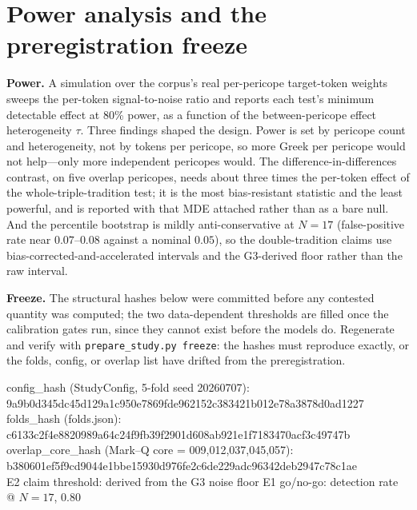 \documentclass[11pt,letterpaper]{article}
\begin{document}
\section{Power analysis and the preregistration freeze}
\label{app:prereg}

\textbf{Power.} A simulation over the corpus's real per-pericope target-token weights sweeps the per-token signal-to-noise ratio and reports each test's minimum detectable effect at 80\% power, as a function of the between-pericope effect heterogeneity $\tau$. Three findings shaped the design. Power is set by pericope count and heterogeneity, not by tokens per pericope, so more Greek per pericope would not help---only more independent pericopes would. The difference-in-differences contrast, on five overlap pericopes, needs about three times the per-token effect of the whole-triple-tradition test; it is the most bias-resistant statistic and the least powerful, and is reported with that MDE attached rather than as a bare null. And the percentile bootstrap is mildly anti-conservative at $N=17$ (false-positive rate near $0.07$--$0.08$ against a nominal $0.05$), so the double-tradition claims use bias-corrected-and-accelerated intervals and the G3-derived floor rather than the raw interval.

\textbf{Freeze.} The structural hashes below were committed before any contested quantity was computed; the two data-dependent thresholds are filled once the calibration gates run, since they cannot exist before the models do. Regenerate and verify with \texttt{prepare\_study.py freeze}: the hashes must reproduce exactly, or the folds, config, or overlap list have drifted from the preregistration.

\begin{tcolorbox}[enhanced, breakable, colback=papyrus, colframe=papyrus,
  boxrule=0pt, arc=0pt, outer arc=0pt,
  borderline west={2.0pt}{0pt}{stone}, left=13pt, right=13pt, top=8pt, bottom=8pt]
{\footnotesize\ttfamily
config\_hash (StudyConfig, 5-fold seed 20260707):\\
\hspace*{1em}9a9b0d345dc45d129a1c950e7869fde962152c383421b012e78a3878d0ad1227\\[2pt]
folds\_hash (folds.json):\\
\hspace*{1em}c6133c2f4e8820989a64c24f9fb39f2901d608ab921e1f7183470acf3c49747b\\[2pt]
overlap\_core\_hash (Mark--Q core = 009,012,037,045,057):\\
\hspace*{1em}b380601ef5f9cd9044e1bbe15930d976fe2c6de229adc96342deb2947c78c1ae\\[2pt]
E2 claim threshold: derived from the G3 noise floor \quad E1 go/no-go: detection rate @ $N{=}17$, 0.80
}
\end{tcolorbox}



\end{document}
